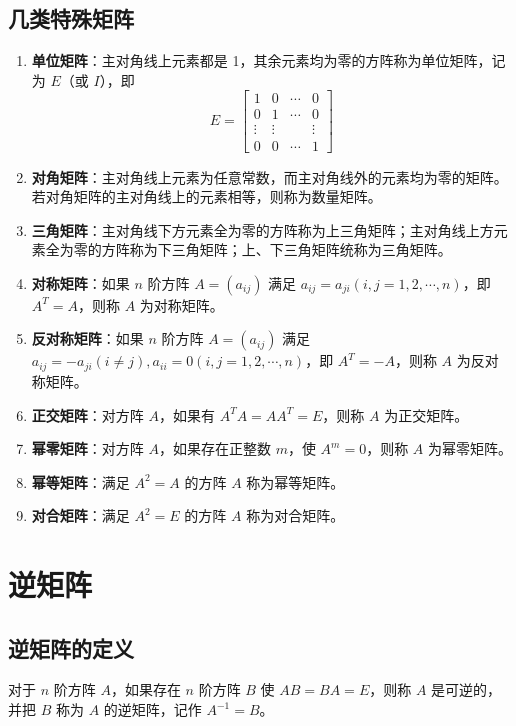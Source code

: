 \documentclass[UTF8]{ctexart}
\theoremstyle{mydef}
\begin{document}
\subsection{几类特殊矩阵}
\begin{enumerate}
    \item \textbf{单位矩阵}：主对角线上元素都是 1，其余元素均为零的方阵称为单位矩阵，记为 $E$（或 $I$），即
    $$
    E = \begin{bmatrix}
    1 & 0 & \cdots & 0 \\
    0 & 1 & \cdots & 0 \\
    \vdots & \vdots & & \vdots \\
    0 & 0 & \cdots & 1
    \end{bmatrix}
    $$
    \item \textbf{对角矩阵}：主对角线上元素为任意常数，而主对角线外的元素均为零的矩阵。若对角矩阵的主对角线上的元素相等，则称为数量矩阵。
    \item \textbf{三角矩阵}：主对角线下方元素全为零的方阵称为上三角矩阵；主对角线上方元素全为零的方阵称为下三角矩阵；上、下三角矩阵统称为三角矩阵。
    \item \textbf{对称矩阵}：如果 $n$ 阶方阵 $A=(a_{ij})$ 满足 $a_{ij} = a_{ji} (i, j=1, 2, \cdots, n)$，即 $A^T = A$，则称 $A$ 为对称矩阵。
    \item \textbf{反对称矩阵}：如果 $n$ 阶方阵 $A=(a_{ij})$ 满足 $a_{ij} = -a_{ji} (i \neq j), a_{ii} = 0 (i, j=1, 2, \cdots, n)$，即 $A^T = -A$，则称 $A$ 为反对称矩阵。
    \item \textbf{正交矩阵}：对方阵 $A$，如果有 $A^T A = A A^T = E$，则称 $A$ 为正交矩阵。
    \item \textbf{幂零矩阵}：对方阵 $A$，如果存在正整数 $m$，使 $A^m = 0$，则称 $A$ 为幂零矩阵。
    \item \textbf{幂等矩阵}：满足 $A^2 = A$ 的方阵 $A$ 称为幂等矩阵。

    \item \textbf{对合矩阵}：满足 $A^2 = E$ 的方阵 $A$ 称为对合矩阵。
\end{enumerate}

\section{逆矩阵}

\subsection{逆矩阵的定义}
对于 $n$ 阶方阵 $A$，如果存在 $n$ 阶方阵 $B$ 使 $AB = BA = E$，则称 $A$ 是可逆的，并把 $B$ 称为 $A$ 的逆矩阵，记作 $A^{-1} = B$。
\end{document}

